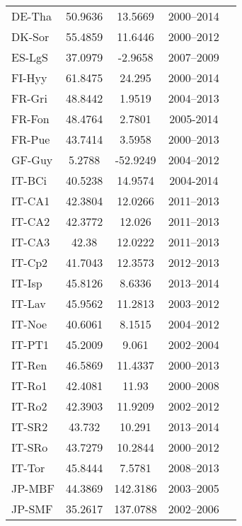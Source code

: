 \begin{longtable}{lcccc}
DE-Tha &  50.9636 &  13.5669 &  2000–2014 &  \cite{Grunwald2007}\\
DK-Sor &  55.4859 &  11.6446 &  2000–2012 &  \cite{Pilegaard2001}\\
ES-LgS &  37.0979 &  -2.9658 &  2007–2009 &  \cite{Reverter2010}\\
FI-Hyy &  61.8475 &  24.295 &  2000–2014 &  \cite{Vesala2005}\\
FR-Gri &  48.8442 &  1.9519 &  2004–2013 &  \cite{Loubet2011}\\
FR-Fon & 48.4764 & 2.7801 & 2005-2014 & \cite{Delpierre2016}\\
FR-Pue &  43.7414 &  3.5958 &  2000–2013 &  \cite{Rambal2004}\\
GF-Guy &  5.2788 &  -52.9249 &  2004–2012 &  \cite{Bonal2008}\\
IT-BCi & 40.5238 & 14.9574 & 2004-2014 & \cite{Vitale2016}\\
IT-CA1 &  42.3804 &  12.0266 &  2011–2013 &  \cite{Sabbatini2016}\\
IT-CA2 &  42.3772 &  12.026 &  2011–2013 &  \cite{Sabbatini2016}\\
IT-CA3 &  42.38 &  12.0222 &  2011–2013 &  \cite{Sabbatini2016}\\
IT-Cp2 &  41.7043 &  12.3573 &  2012–2013 &  \cite{Fares2015}\\
IT-Isp &  45.8126 &  8.6336 &  2013–2014 &  \cite{Ferrea2012}\\
IT-Lav &  45.9562 &  11.2813 &  2003–2012 &  \cite{Cescatti2003}\\
IT-Noe &  40.6061 &  8.1515 &  2004–2012 &  \cite{Spano2005}\\
IT-PT1 &  45.2009 &  9.061 &  2002–2004 &  \cite{Migliavacca2009}\\
IT-Ren &  46.5869 &  11.4337 &  2000–2013 &  \cite{Marcolla2005}\\
IT-Ro1 &  42.4081 &  11.93 &  2000–2008 &  \cite{Rey2002}\\
IT-Ro2 &  42.3903 &  11.9209 &  2002–2012 &  \cite{Tedeschi2006}\\
IT-SR2 &  43.732 &  10.291 &  2013–2014 &  \cite{Matteucci2015}\\
IT-SRo &  43.7279 &  10.2844 &  2000–2012 &  \cite{Matteucci2015}\\
IT-Tor &  45.8444 &  7.5781 &  2008–2013 &  \cite{Galvagno2013}\\
JP-MBF &  44.3869 &  142.3186 &  2003–2005 &  \cite{Yamazaki2013}\\
JP-SMF &  35.2617 &  137.0788 &  2002–2006 &  \cite{Yamazaki2013}\\

\end{longtable}
